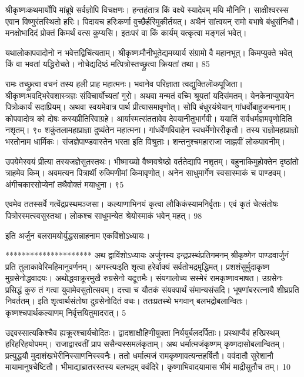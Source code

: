 श्रीकृष्णःकथमार्योपि मांब्रूषे सर्वज्ञोपि विचक्षणः।
हन्तहंतात्र किं वक्ष्ये स्यादेवम् मयि मौनिनि।
साक्षीश्वरस्स एवान विष्णुरंतस्थितो हरिः।
पिदायच हरिःकर्णा वुच्छैर्हरिमुकीर्तयत्।
अथैनं सांत्वयन् रामो बभाषे बंधुसंनिधौ।
मनक्षोभादिदं प्रोक्तं किमर्थं वत्स कुप्यसि।
इतःपरं वा किं कार्यम् यत्कृत्वा मङ्गलं भवेत्।

यथालोकापवादोनो न भवेत्तद्विचिंत्यताम्।
श्रीकृष्णःमौनीभूतेद्यमय्यार्य संग्रामो वै महानभूत्।
किमप्युक्ते भवेत् किं वा भवतां यद्धिरोचते।
नोचेद्यदिष्ठं मत्पित्रोस्तच्छ्रुत्वा क्रियतां तथा।
85


रामः
तच्छ्रुत्वा वचनं तस्य हली प्राह महात्मनः।
भवानेव परिज्ञाता त्वद्युक्तिलॊकपूजिता।
श्रीकृष्णःभवद्भिरेवशास्त्रज्ञः संविचार्योच्यतां गुरो।
अथवा मन्मतं वच्मि श्रूयतां यदिसंमतम्।
येनकेनाप्युपायेन पित्रोःकार्यं सदाप्रियम्।
अथवा स्वयमेवात्र पार्थ प्रीत्यासमावृणोत्।
सोपि बंधुरयंश्रेयान् गांधर्वोबाहुजन्मनाम्।
कोपवादोत्र को दोषः कस्यप्रीतिरिवाग्रहे।
आर्यास्मत्संततावेव देवयानीतुभार्गवी।
ययातिं सर्वधर्मज्ञमवृणोदिति नशृतम्।
९० शकुंतलामहाप्राज्ञा दुष्यंतेन महात्मना।
गांधर्वेणविवाहेन स्वधर्मेणोररीकृतौ।
तस्य राज्ञोमहाप्राज्ञो भरतोनाम धार्मिकः।
संजज्ञेपाण्डवास्तेन भरता इति विश्रुताः।
शन्तनुश्चमहाराजा जाह्नवीं लोकपावनीम्।

उपयेमेस्वयं प्रीत्या तस्यजज्ञेसुतस्तथः।
भीष्माख्यो वैष्णवश्रेष्ठो वर्ततेद्यापि नशृतम्।
बहुनाकिमुहोक्तेन दृष्ठांतो त्राहमेव किम्।
अवमत्यन पित्रार्थी रुक्मिणीमां किमावृणोत्।
अनेन साधुमार्गेण स्वसास्माकं च पाण्डवम्।
अंगीचकारसोप्येनां तथैवोक्तं मयाधुना।
९5

एवमेव ततस्सर्वे गत्वेंद्रप्रस्थमञ्जसा।
कल्याणाभिनयं कृत्वा लौकिकंस्यामनिर्वृताः।
एवं कृतं चेत्संतोषः पित्रोरस्मत्स्वसुस्तथा।
लोकश्च साधुमन्येत श्रेयोस्माकं भवेन् महत्।
98

इति अर्जुन बलरामयोर्युद्धसन्नाहनाम
एकविंशोऽध्यायः।

*********************
अथ द्वाविंशोऽध्यायः अर्जुनस्य इन्द्रप्रस्थंप्रतिगमनम् श्रीकृष्णेन पाण्डवार्जुनं प्रति तुलाकावेरिमहिमानुवर्णनम्।
अगस्त्यःइति शृत्वा हरेर्वाक्यं सर्वतोभद्रमृद्धिमत्।
प्रशशंसुर्मुदाकृष्ण मुग्रसेनोद्धवादयः।
अथोद्धवाक्रूरमुखै रुग्रसेनो यदूत्तमैः।
संयगालोच्य सस्मेरं रामकृष्णावभाषत।
उग्रसेनः
प्रसिद्धं कुरु तं गत्वा युवामेवसुतोत्सवम्।
दत्त्वा च यौतकं संयक्पार्थं संमान्यसंसदि।
भूषणांबररत्नायै शीघ्रप्रति निवर्ततम्।
इति शृत्वार्थसंतोषा दुग्रसेनोदितं वचः।
ततःप्रतस्थे भगवान् बलभद्रोबलान्वितः।
कृष्णश्चपार्थकल्याणम् निर्वृत्तयितुमादरात्।
5

उद्दवस्सात्यकिश्चैव ह्यक्रूरश्चार्यचोदितः।
द्वादशाक्षौहिणीयुक्ता निर्ययुर्बलदर्पिताः।
प्रस्थाप्यैवं हरिप्रस्थम् हरिहरिहयोपमम्।
राजाद्वारवतीं प्राप ससैन्यस्समलंकृताम्।
अथ धर्मात्मजंकृष्णम् कृष्णदासोबलान्वितम्।
प्रत्युद्धयौ मुदाशंखभेरीनिस्साणनिस्स्वनैः।
ततो धर्मात्मजं रामकृष्णावत्यन्तहर्षितौ।
ववंदातौ सुरेशानौ मायामानुषचेष्टितौ।
भीमाद्याब्रातरस्तस्य बलभद्रम् ववंदिरे।
कृष्णाभिवादयामास भीमं माद्रीसुतौच तम्।
10

